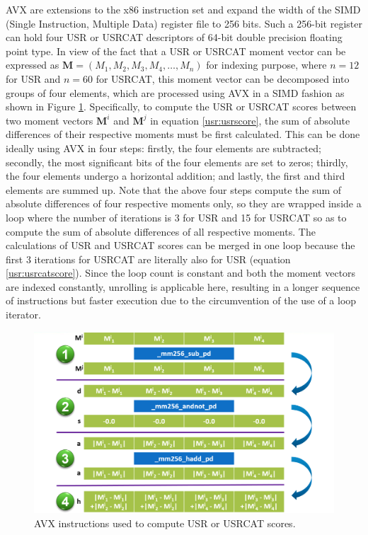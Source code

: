 AVX are extensions to the x86 instruction set and expand the width of the SIMD (Single Instruction, Multiple Data) register file to 256 bits. Such a 256-bit register can hold four USR or USRCAT descriptors of 64-bit double precision floating point type. In view of the fact that a USR or USRCAT moment vector can be expressed as $\mathbf M=(M_1, M_2, M_3, M_4, \ldots, M_n)$ for indexing purpose, where $n=12$ for USR and $n=60$ for USRCAT, this moment vector can be decomposed into groups of four elements, which are processed using AVX in a SIMD fashion as shown in Figure \ref{usr:AVX}. Specifically, to compute the USR or USRCAT scores between two moment vectors $\mathbf M^i$ and $\mathbf M^j$ in equation \eqref{usr:usrscore}, the sum of absolute differences of their respective moments must be first calculated. This can be done ideally using AVX in four steps: firstly, the four elements are subtracted; secondly, the most significant bits of the four elements are set to zeros; thirdly, the four elements undergo a horizontal addition; and lastly, the first and third elements are summed up. Note that the above four steps compute the sum of absolute differences of four respective moments only, so they are wrapped inside a loop where the number of iterations is 3 for USR and 15 for USRCAT so as to compute the sum of absolute differences of all respective moments. The calculations of USR and USRCAT scores can be merged in one loop because the first 3 iterations for USRCAT are literally also for USR (equation \eqref{usr:usrcatscore}). Since the loop count is constant and both the moment vectors are indexed constantly, unrolling is applicable here, resulting in a longer sequence of instructions but faster execution due to the circumvention of the use of a loop iterator.

\begin{figure}
\begin{center}
\includegraphics[width=\linewidth]{../usr/AVX.png}
\end{center}
\caption{AVX instructions used to compute USR or USRCAT scores.}
\label{usr:AVX}
\end{figure}

